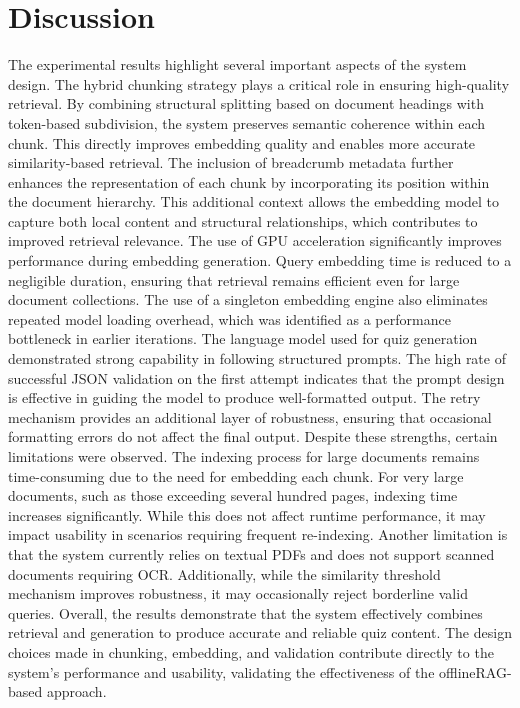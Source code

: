 \documentclass[12pt,a4paper]{report}
\begin{document}
\section{Discussion}
The experimental results highlight several important aspects of the system design. The hybrid chunking strategy plays a critical role in ensuring high-quality retrieval. By combining structural splitting based on document headings with token-based subdivision, the system preserves semantic coherence within each chunk. This directly improves embedding quality and enables more accurate similarity-based retrieval.
The inclusion of breadcrumb metadata further enhances the representation of each chunk by incorporating its position within the document hierarchy. This additional context allows the embedding model to capture both local content and structural relationships, which contributes to improved retrieval relevance.
The use of GPU acceleration significantly improves performance during embedding generation. Query embedding time is reduced to a negligible duration, ensuring that retrieval remains efficient even for large document collections. The use of a singleton embedding engine also eliminates repeated model loading overhead, which was identified as a performance bottleneck in earlier iterations.
The language model used for quiz generation demonstrated strong capability in following structured prompts. The high rate of successful JSON validation on the first attempt indicates that the prompt design is effective in guiding the model to produce well-formatted output. The retry mechanism provides an additional layer of robustness, ensuring that occasional formatting errors do not affect the final output.
Despite these strengths, certain limitations were observed. The indexing process for large documents remains time-consuming due to the need for embedding each chunk. For very large documents, such as those exceeding several hundred pages, indexing time increases significantly. While this does not affect runtime performance, it may impact usability in scenarios requiring frequent re-indexing.
Another limitation is that the system currently relies on textual PDFs and does not support scanned documents requiring OCR. Additionally, while the similarity threshold mechanism improves robustness, it may occasionally reject borderline valid queries.
Overall, the results demonstrate that the system effectively combines retrieval and generation to produce accurate and reliable quiz content. The design choices made in chunking, embedding, and validation contribute directly to the system’s performance and usability, validating the effectiveness of the offlineRAG-based approach.
\end{document}
